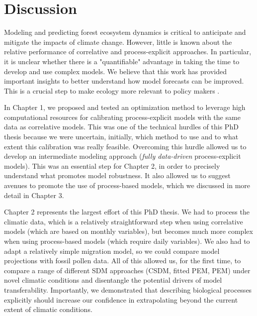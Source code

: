 \section{Discussion}

\vspace*{1cm}

Modeling and predicting forest ecosystem dynamics is critical to anticipate and mitigate the impacts of climate change. 
However, little is known about the relative performance of correlative and process-explicit approaches. In particular, it is unclear whether there is a "quantifiable" advantage in taking the time to develop and use complex models. We believe that this work has provided important insights to better understand how model forecasts can be improved. This is a crucial step to make ecology more relevant to policy makers \citep{Dietze2017}.

In Chapter 1, we proposed and tested an optimization method to leverage high computational resources for calibrating process-explicit models with the same data as correlative models. This was one of the technical hurdles of this PhD thesis because we were uncertain, initially, which method to use and to what extent this calibration was really feasible. Overcoming this hurdle allowed us to develop an intermediate modeling approach (\emph{fully data-driven} process-explicit models). This was an essential step for Chapter 2, in order to precisely understand what promotes model robustness. It also allowed us to suggest avenues to promote the use of process-based models, which we discussed in more detail in Chapter 3.

Chapter 2 represents the largest effort of this PhD thesis. We had to process the climatic data, which is a relatively straightforward step when using correlative models (which are based on monthly variables), but becomes much more complex when using process-based models (which require daily variables). We also had to adapt a relatively simple migration model, so we could compare model projections with fossil pollen data. All of this allowed us, for the first time, to compare a range of different SDM approaches (CSDM, fitted PEM, PEM) under novel climatic conditions and disentangle the potential drivers of model transferability. Importantly, we demonstrated that describing biological processes explicitly should increase our confidence in extrapolating beyond the current extent of climatic conditions. 

